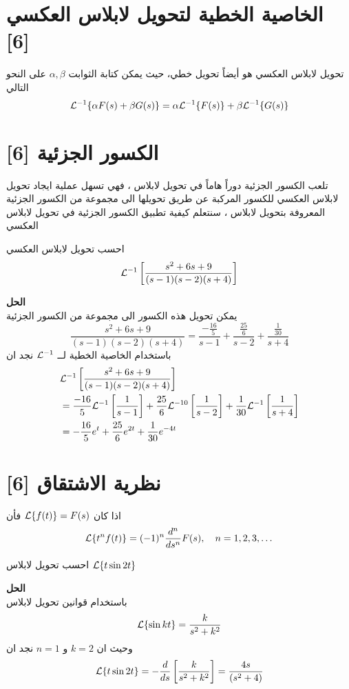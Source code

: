  \section{الخاصية الخطية لتحويل لابلاس العكسي [6]}
  تحويل لابلاس العكسي هو أيضاً تحويل خطي، حيث يمكن كتابة الثوابت $\alpha, \beta$ على  النحو التالي
  \begin{equation}
  	\mathcal{L}^{-1} \{\alpha F(s) + \beta G(s)\} = \alpha \mathcal{L}^{-1} \{F(s)\} + \beta \mathcal{L}^{-1} \{G(s)\}
  \end{equation}
  
  \section{الكسور الجزئية [6]}
 تلعب الكسور الجزئية دوراً هاماً في تحويل لابلاس ، فهي تسهل عملية ايجاد تحويل لابلاس العكسي للكسور المركبة عن طريق تحويلها الى مجموعة من الكسور الجزئية المعروفة بتحويل لابلاس ، سنتعلم كيفية تطبيق الكسور الجزئية في تحويل لابلاس العكسي
 
 \begin{example}
 	احسب تحويل لابلاس العكسي
 	\[
 	\mathcal{L}^{-1} \left[\frac{s^2 + 6s + 9}{(s-1)(s-2)(s+4)}\right]
 	\]
 \end{example}
 \noindent
 \textbf{الحل}\\
 \noindent
 يمكن تحويل هذه الكسور الى مجموعة من الكسور الجزئية 
 \[
 \frac{s^2 + 6s + 9}{(s-1)(s-2)(s+4)} = \frac{-\frac{16}{5}}{s-1} + \frac{\frac{25}{6}}{s-2} + \frac{\frac{1}{30}}{s+4}
 \]
 باستخدام الخاصية الخطية لــ $\mathcal{L}^{-1}$ نجد ان 
 \begin{align*}
 	&\mathcal{L}^{-1} \left[\frac{s^2 + 6s + 9}{(s-1)(s-2)(s+4)}\right]\\
 	 &= \frac{-16}{5}\mathcal{L}^{-1}\left[\frac{1}{s-1}\right] + \frac{25}{6} \mathcal{L}^{-10}\left[\frac{1}{s-2}\right] + \frac{1}{30} \mathcal{L}^{-1}\left[\frac{1}{s+4}\right]\\
 	 &=-\frac{16}{5}e^{t} + \frac{25}{6} e^{2t} + \frac{1}{30 } e^{-4t}
  \end{align*}
  
  \section{نظرية الاشتقاق [6]}
  \begin{theorem}
  	اذا كان $\mathcal{L}\{f(t)\} = F(s)$ فأن
  	\[
  	\mathcal{L}\{t^n f(t)\} = (-1)^n \frac{d^n}{ds^n} F(s), \quad n=1,2,3,\dots
   	\]
  \end{theorem}
  
  \begin{example}
  	احسب تحويل لابلاس $\mathcal{L}\{t\sin 2t\}$
  \end{example}
  \noindent
  \textbf{الحل}\\
  \noindent
  باستخدام قوانين تحويل لابلاس
  \[
  \mathcal{L}\{\sin kt\} = \frac{k}{s^2 + k^2}
   \]
   وحيث ان $k=2$ و $n=1$ نجد ان
   \[
   \mathcal{L}\{t\sin 2t\} = -\frac{d}{ds}\left[\frac{k}{s^2 + k^2}\right] = \frac{4s}{(s^2 + 4)}
   \]

